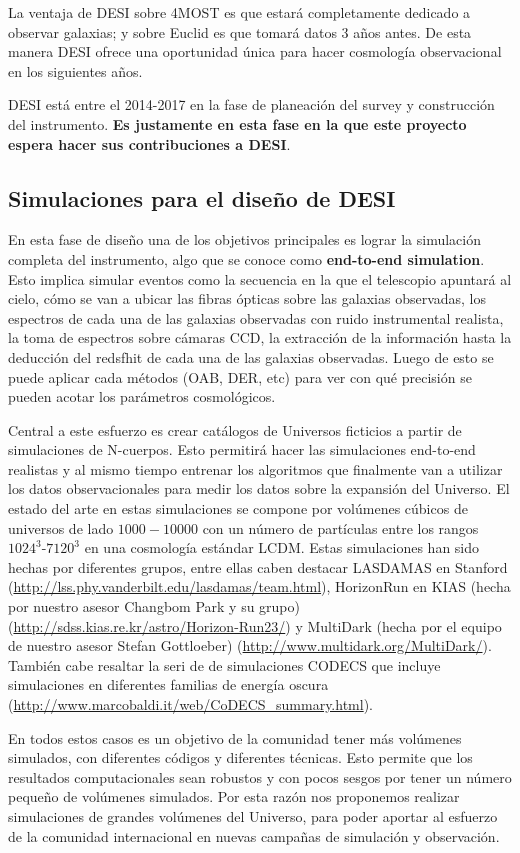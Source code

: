 La ventaja de DESI sobre 4MOST es que estar\'a completamente dedicado
a observar galaxias; y sobre Euclid es que tomar\'a datos 3 a\~nos
antes. De esta manera DESI ofrece una oportunidad \'unica para hacer
cosmolog\'ia observacional en los siguientes a\~nos. 

DESI est\'a entre el 2014-2017 en la fase de planeaci\'on del survey y
construcci\'on del instrumento. {\bf Es justamente en esta fase en la que
este proyecto espera hacer sus contribuciones a DESI}.


\subsection{Simulaciones para el dise\~no de DESI}

En esta fase de dise\~no una de los objetivos principales es lograr la
simulaci\'on completa del 
instrumento, algo que se conoce como {\bf
  end-to-end simulation}. Esto implica simular eventos como la
secuencia en la que el telescopio apuntar\'a al cielo, c\'omo se van a
ubicar las fibras \'opticas sobre las galaxias observadas, los
espectros de cada una de las galaxias observadas con ruido
instrumental realista, la toma de espectros sobre c\'amaras CCD, la
extracci\'on de la informaci\'on hasta la deducci\'on del redsfhit de
cada una de las galaxias observadas. 
Luego de esto se puede aplicar
cada m\'etodos (OAB, DER, etc) para ver con qu\'e precisi\'on se
pueden acotar los par\'ametros cosmol\'ogicos. 

Central a este esfuerzo es crear cat\'alogos de Universos ficticios a
partir de simulaciones de N-cuerpos. 
Esto permitir\'a hacer las
simulaciones end-to-end realistas y al mismo tiempo entrenar los
algoritmos que finalmente van a utilizar los datos observacionales
para medir los datos sobre la expansi\'on del Universo. El estado del
arte en estas simulaciones se compone por vol\'umenes c\'ubicos de
universos  de lado $1000-10000$\hMpc
con un n\'umero de part\'iculas entre los rangos
$1024^3$-$7120^3$ en una cosmolog\'ia est\'andar LCDM. Estas
simulaciones han sido hechas por diferentes grupos, entre ellas caben
destacar LASDAMAS en Stanford
(\url{http://lss.phy.vanderbilt.edu/lasdamas/team.html}), HorizonRun en KIAS (hecha por nuestro asesor Changbom Park y su grupo)
(\url{http://sdss.kias.re.kr/astro/Horizon-Run23/}) y MultiDark (hecha
por el equipo de nuestro asesor Stefan Gottloeber)
(\url{http://www.multidark.org/MultiDark/}). Tambi\'en cabe resaltar
la seri de de simulaciones CODECS que incluye simulaciones en
diferentes familias de energ\'ia oscura
(\url{http://www.marcobaldi.it/web/CoDECS_summary.html}). 

En todos estos casos es un objetivo de la comunidad tener más
volúmenes simulados, con diferentes códigos y diferentes técnicas. 
Esto permite que los resultados computacionales sean robustos y con
pocos sesgos por tener un número pequeño de volúmenes simulados. 
Por esta razón nos proponemos realizar simulaciones de grandes
volúmenes del Universo, para poder aportar al esfuerzo de la comunidad
internacional en nuevas campañas de simulación y observación.










